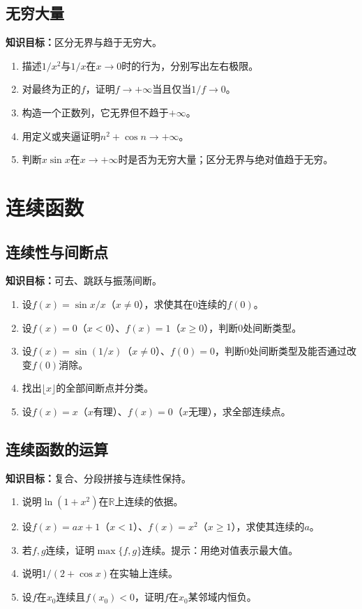 \documentclass[11pt,a4paper,fontset=fandol]{ctexrep}
\newcommand{\goal}[1]{\textbf{知识目标：}#1\par}
\begin{document}
\subsection{无穷大量}
\goal{区分无界与趋于无穷大。}
\begin{enumerate}
\item 描述$1/x^2$与$1/x$在$x\to0$时的行为，分别写出左右极限。
\item 对最终为正的$f$，证明$f\to+\infty$当且仅当$1/f\to0$。
\item 构造一个正数列，它无界但不趋于$+\infty$。
\item 用定义或夹逼证明$n^2+\cos n\to+\infty$。
\item 判断$x\sin x$在$x\to+\infty$时是否为无穷大量；区分无界与绝对值趋于无穷。
\end{enumerate}
\section{连续函数}
\subsection{连续性与间断点}
\goal{可去、跳跃与振荡间断。}
\begin{enumerate}
\item 设$f(x)=\sin x/x$（$x\ne0$），求使其在$0$连续的$f(0)$。
\item 设$f(x)=0$（$x<0$）、$f(x)=1$（$x\ge0$），判断$0$处间断类型。
\item 设$f(x)=\sin(1/x)$（$x\ne0$）、$f(0)=0$，判断$0$处间断类型及能否通过改变$f(0)$消除。
\item 找出$\lfloor x\rfloor$的全部间断点并分类。
\item 设$f(x)=x$（$x$有理）、$f(x)=0$（$x$无理），求全部连续点。
\end{enumerate}
\subsection{连续函数的运算}
\goal{复合、分段拼接与连续性保持。}
\begin{enumerate}
\item 说明$\ln(1+x^2)$在$\mathbb R$上连续的依据。
\item 设$f(x)=ax+1$（$x<1$）、$f(x)=x^2$（$x\ge1$），求使其连续的$a$。
\item 若$f,g$连续，证明$\max\{f,g\}$连续。提示：用绝对值表示最大值。
\item 说明$1/(2+\cos x)$在实轴上连续。
\item 设$f$在$x_0$连续且$f(x_0)<0$，证明$f$在$x_0$某邻域内恒负。
\end{enumerate}
\end{document}
